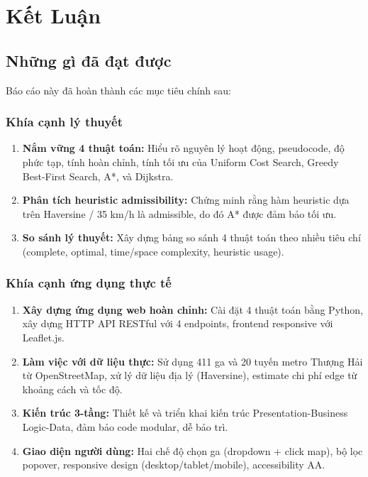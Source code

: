 
\chapter{Kết Luận}

\section{Những gì đã đạt được}

Báo cáo này đã hoàn thành các mục tiêu chính sau:

\subsection{Khía cạnh lý thuyết}

\begin{enumerate}
  \item \textbf{Nắm vững 4 thuật toán:} Hiểu rõ nguyên lý hoạt động, pseudocode, độ phức tạp, tính hoàn chỉnh, tính tối ưu của Uniform Cost Search, Greedy Best-First Search, A*, và Dijkstra.

  \item \textbf{Phân tích heuristic admissibility:} Chứng minh rằng hàm heuristic dựa trên Haversine / 35 km/h là admissible, do đó A* được đảm bảo tối ưu.

  \item \textbf{So sánh lý thuyết:} Xây dựng bảng so sánh 4 thuật toán theo nhiều tiêu chí (complete, optimal, time/space complexity, heuristic usage).
\end{enumerate}

\subsection{Khía cạnh ứng dụng thực tế}

\begin{enumerate}
  \item \textbf{Xây dựng ứng dụng web hoàn chỉnh:} Cài đặt 4 thuật toán bằng Python, xây dựng HTTP API RESTful với 4 endpoints, frontend responsive với Leaflet.js.

  \item \textbf{Làm việc với dữ liệu thực:} Sử dụng 411 ga và 20 tuyến metro Thượng Hải từ OpenStreetMap, xử lý dữ liệu địa lý (Haversine), estimate chi phí edge từ khoảng cách và tốc độ.

  \item \textbf{Kiến trúc 3-tầng:} Thiết kế và triển khai kiến trúc Presentation-Business Logic-Data, đảm bảo code modular, dễ bảo trì.

  \item \textbf{Giao diện người dùng:} Hai chế độ chọn ga (dropdown + click map), bộ lọc popover, responsive design (desktop/tablet/mobile), accessibility AA.
\end{enumerate}

